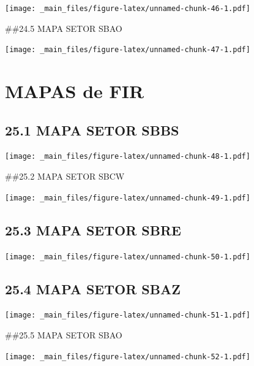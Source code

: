 \documentclass[
]{book}
\theoremstyle{definition}
\theoremstyle{definition}
\theoremstyle{definition}
\theoremstyle{definition}
\theoremstyle{remark}
\begin{document}
\texttt{[image: \_main\_files/figure-latex/unnamed-chunk-46-1.pdf]}

\#\#24.5 MAPA SETOR SBAO

\texttt{[image: \_main\_files/figure-latex/unnamed-chunk-47-1.pdf]}

\hypertarget{mapas-de-fir}{%
\chapter{MAPAS de FIR}\label{mapas-de-fir}}

\hypertarget{mapa-setor-sbbs-1}{%
\section{25.1 MAPA SETOR SBBS}\label{mapa-setor-sbbs-1}}

\texttt{[image: \_main\_files/figure-latex/unnamed-chunk-48-1.pdf]}

\#\#25.2 MAPA SETOR SBCW

\texttt{[image: \_main\_files/figure-latex/unnamed-chunk-49-1.pdf]}

\hypertarget{mapa-setor-sbre-1}{%
\section{25.3 MAPA SETOR SBRE}\label{mapa-setor-sbre-1}}

\texttt{[image: \_main\_files/figure-latex/unnamed-chunk-50-1.pdf]}

\hypertarget{mapa-setor-sbaz-1}{%
\section{25.4 MAPA SETOR SBAZ}\label{mapa-setor-sbaz-1}}

\texttt{[image: \_main\_files/figure-latex/unnamed-chunk-51-1.pdf]}

\#\#25.5 MAPA SETOR SBAO

\texttt{[image: \_main\_files/figure-latex/unnamed-chunk-52-1.pdf]}
\end{document}
